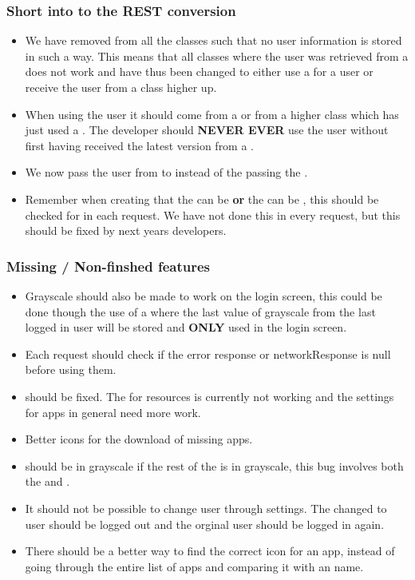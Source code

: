 \subsubsection{Short into to the REST conversion}
\begin{itemize}
  \item We have removed  from all the classes such that
  no user information is stored in such a way. This means that all classes where the
  user was retrieved from a  does not work and have thus
  been changed to either use a  for a user or receive
  the user from a class higher up.
  \item When using the user it should come from a  or from a
  higher class which has just used a . The developer
  should \textbf{NEVER EVER} use the user without first having received the
  latest version from a . 
  \item We now pass the user from  to  instead of
  the passing the .
  \item Remember when creating  that the 
  can be  \textbf{or} the  can be
  , this should be checked for in each request. We have not done
  this in every request, but this should be fixed by next years developers.
\end{itemize}

\subsubsection{Missing / Non-finshed features}

\begin{itemize}
  \item Grayscale should also be made to work on the login screen, this
  could be done though the use of a  where the last
  value of grayscale from the last logged in user will be stored and
  \textbf{ONLY} used in the login screen.
  \item Each request should check if the error response or networkResponse is
  null before using them.
  \item {} should be fixed. The  for resources
  is currently not working and the settings for apps in general need more work.
  \item Better icons for the download of missing apps.
  \item {} should be in grayscale if the rest of the
   is in grayscale, this bug involves both the 
  and .
  \item It should not be possible to change user through settings. The changed
  to user should be logged out and the orginal user should be logged in again.
  \item There should be a better way to find the correct icon for an app,
  instead of going through the entire list of apps and comparing it with an
   name.
\end{itemize}

